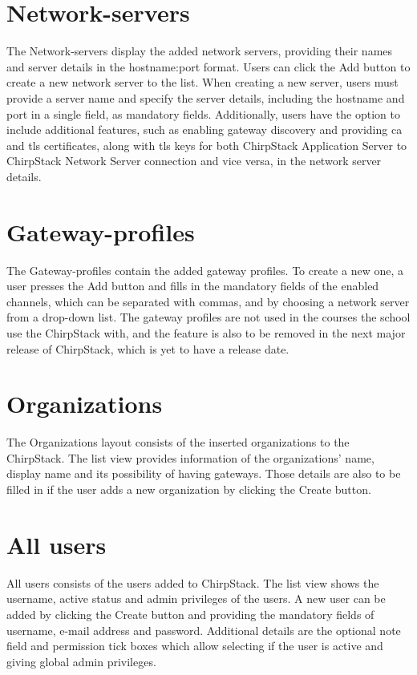 \section{Network-servers}
The Network-servers display the added network servers, providing their names and server details in the hostname:port format.
Users can click the Add button to create a new network server to the list.
When creating a new server, users must provide a server name and specify the server details, including the hostname and port in a single field, as mandatory fields.
Additionally, users have the option to include additional features, such as enabling gateway discovery and providing \gls{ca} and \gls{tls} certificates, along with \gls{tls} keys for both ChirpStack Application Server to ChirpStack Network Server connection and vice versa, in the network server details.

\section{Gateway-profiles}
The Gateway-profiles contain the added gateway profiles.
To create a new one, a user presses the Add button and fills in the mandatory fields of the enabled channels, which can be separated with commas, and by choosing a network server from a drop-down list.
The gateway profiles are not used in the courses the school use the ChirpStack with, and the feature is also to be removed in the next major release of ChirpStack, which is yet to have a release date.

\section{Organizations}
The Organizations layout consists of the inserted organizations to the ChirpStack.
The list view provides information of the organizations' name, display name and its possibility of having gateways.
Those details are also to be filled in if the user adds a new organization by clicking the Create button.

\section{All users}
All users consists of the users added to ChirpStack.
The list view shows the username, active status and admin privileges of the users.
A new user can be added by clicking the Create button and providing the mandatory fields of username, e-mail address and password.
Additional details are the optional note field and permission tick boxes which allow selecting if the user is active and giving global admin privileges.


